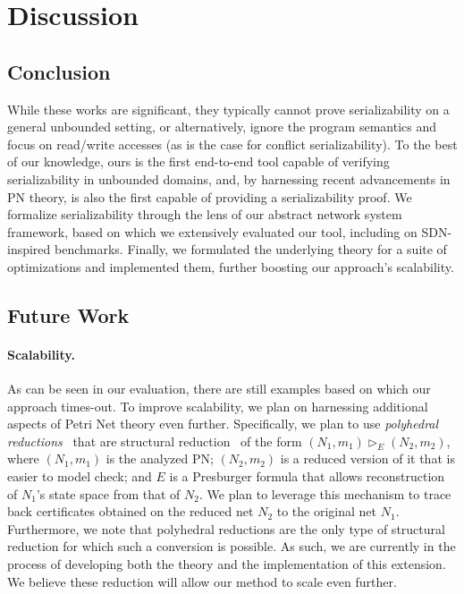 \section{Discussion}
\label{sec:discussion}

\subsection{Conclusion}

While these works are significant, they typically cannot prove serializability on a general unbounded setting, or alternatively, ignore the program semantics and focus on read/write accesses (as is the case for conflict serializability).
%
To the best of our knowledge, ours is the first end-to-end
tool capable of verifying serializability in unbounded domains, and, by harnessing recent advancements in PN theory, is also the first  capable of providing a serializability proof.
%
We formalize serializability through the lens of our abstract network system framework, based on which we extensively evaluated our tool, including on SDN-inspired benchmarks. 
%
Finally, we formulated the underlying theory for a suite of optimizations and implemented them, further boosting our approach’s scalability.

%

\subsection{Future Work}

\paragraph{Scalability.}

As can be seen in our evaluation, there are still examples based on which our approach times-out.
To improve scalability, we plan on harnessing additional aspects of Petri Net theory even further.
%
Specifically, we plan to use \textit{polyhedral reductions}~\cite{AmBeDa21} that are structural reduction~\cite{Be87,BeLeDa20} of the form $(N_1, m_1) \vartriangleright_E (N_2, m_2)$, where $(N_1, m_1)$ is the analyzed PN;  $(N_2, m_2)$ is a reduced version of it that is easier to model check; and $E$ is a Presburger formula that allows reconstruction of $N_1$'s state space from that of $N_2$. We plan to leverage this mechanism to trace back certificates obtained on the reduced net $N_2$ to the original net $N_1$.
%
%
Furthermore, we note that polyhedral reductions are the only type of structural reduction for which such a conversion is possible.
%
As such, we are currently in the process of developing both the theory and the implementation of this extension.
We believe these reduction will allow our method to scale even further.

